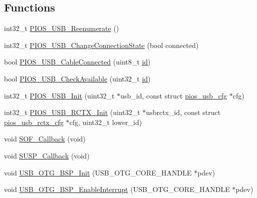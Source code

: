\subsection*{\-Functions}
\begin{DoxyCompactItemize}
\item 
int32\-\_\-t \hyperlink{group___p_i_o_s___u_s_b_ga45bd0a1ecf523ffdf65fc78cbf8574ea}{\-P\-I\-O\-S\-\_\-\-U\-S\-B\-\_\-\-Reenumerate} ()
\item 
int32\-\_\-t \hyperlink{group___p_i_o_s___u_s_b_gaa1c6f1779e0397ed1637e700c04d6309}{\-P\-I\-O\-S\-\_\-\-U\-S\-B\-\_\-\-Change\-Connection\-State} (bool connected)
\item 
bool \hyperlink{group___p_i_o_s___u_s_b_gaf085b2e125dd44d34217829ffe283694}{\-P\-I\-O\-S\-\_\-\-U\-S\-B\-\_\-\-Cable\-Connected} (uint8\-\_\-t \hyperlink{uavobjectmanager_8c_abaabdc509cdaba7df9f56c6c76f3ae19}{id})
\item 
bool \hyperlink{group___p_i_o_s___u_s_b_gab421c578c5d8da4eff14b6ce21c0cb5f}{\-P\-I\-O\-S\-\_\-\-U\-S\-B\-\_\-\-Check\-Available} (uint32\-\_\-t \hyperlink{uavobjectmanager_8c_abaabdc509cdaba7df9f56c6c76f3ae19}{id})
\item 
int32\-\_\-t \hyperlink{group___p_i_o_s___u_s_b_ga462c4ceef5cdec4df10b00b90dbc0735}{\-P\-I\-O\-S\-\_\-\-U\-S\-B\-\_\-\-Init} (uint32\-\_\-t $\ast$usb\-\_\-id, const struct \hyperlink{structpios__usb__cfg}{pios\-\_\-usb\-\_\-cfg} $\ast$cfg)
\item 
int32\-\_\-t \hyperlink{group___p_i_o_s___u_s_b_ga335e2cdbbb185681f189b0f030bd712c}{\-P\-I\-O\-S\-\_\-\-U\-S\-B\-\_\-\-R\-C\-T\-X\-\_\-\-Init} (uint32\-\_\-t $\ast$usbrctx\-\_\-id, const struct \hyperlink{structpios__usb__rctx__cfg}{pios\-\_\-usb\-\_\-rctx\-\_\-cfg} $\ast$cfg, uint32\-\_\-t lower\-\_\-id)
\item 
void \hyperlink{group___p_i_o_s___u_s_b_gaa3a23e7d4ec85e79cf28841529f081be}{\-S\-O\-F\-\_\-\-Callback} (void)
\item 
void \hyperlink{group___p_i_o_s___u_s_b_gac123415bdaa5f7dc62947bd086bccebd}{\-S\-U\-S\-P\-\_\-\-Callback} (void)
\item 
void \hyperlink{group___p_i_o_s___u_s_b_gacffb89e4346b11dee704fe5a40326a1f}{\-U\-S\-B\-\_\-\-O\-T\-G\-\_\-\-B\-S\-P\-\_\-\-Init} (\-U\-S\-B\-\_\-\-O\-T\-G\-\_\-\-C\-O\-R\-E\-\_\-\-H\-A\-N\-D\-L\-E $\ast$pdev)
\item 
void \hyperlink{group___p_i_o_s___u_s_b_ga38bdd94d09d00f27d1343fdb0babdfa1}{\-U\-S\-B\-\_\-\-O\-T\-G\-\_\-\-B\-S\-P\-\_\-\-Enable\-Interrupt} (\-U\-S\-B\-\_\-\-O\-T\-G\-\_\-\-C\-O\-R\-E\-\_\-\-H\-A\-N\-D\-L\-E $\ast$pdev)

\end{DoxyCompactItemize}
